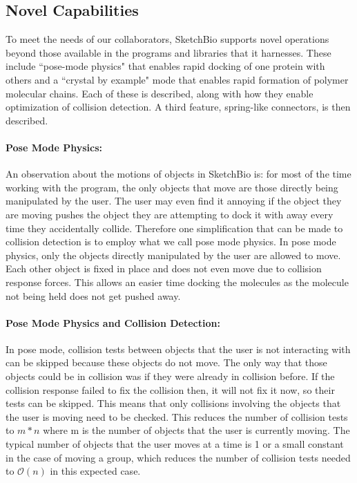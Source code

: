 \documentclass[twocolumn]{bmcart}%
\begin{document}
\subsection*{Novel Capabilities}

To meet the needs of our collaborators, SketchBio supports novel operations beyond those available in the programs and libraries that it harnesses.  These include ``pose-mode physics" that enables rapid docking of one protein with others and a ``crystal by example" mode that enables rapid formation of polymer molecular chains.  Each of these is described, along with how they enable optimization of collision detection.  A third feature, spring-like connectors, is then described.

\paragraph*{Pose Mode Physics:}
An observation about the motions of objects in SketchBio is: for most of the time working with the program, the only objects that move are those directly being manipulated by the user.  The user may even find it annoying if the object they are moving pushes the object they are attempting to dock it with away every time they accidentally collide.  Therefore one simplification that can be made to collision detection is to employ what we call pose mode physics.  In pose mode physics, only the objects directly manipulated by the user are allowed to move.  Each other object is fixed in place and does not even move due to collision response forces.  This allows an easier time docking the molecules as the molecule not being held does not get pushed away.

\paragraph*{Pose Mode Physics and Collision Detection:}
In pose mode, collision tests between objects that the user is not interacting with can be skipped because these objects do not move.  The only way that those objects could be in collision was if they were already in collision before.  If the collision response failed to fix the collision then, it will not fix it now, so their tests can be skipped.  This means that only collisions involving the objects that the user is moving need to be checked.  This reduces the number of collision tests to $m*n$ where m is the number of objects that the user is currently moving.  The typical number of objects that the user moves at a time is 1 or a small constant in the case of moving a group, which reduces the number of collision tests needed to $\mathcal{O}(n)$ in this expected case.
\end{document}
